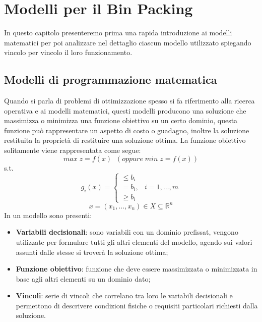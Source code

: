
\chapter{Modelli per il Bin Packing}\label{chap:four}
In questo capitolo presenteremo prima una rapida introduzione ai modelli matematici per poi analizzare nel dettaglio ciascun modello utilizzato spiegando vincolo per vincolo il loro funzionamento.

\section{Modelli di programmazione matematica}
Quando si parla di problemi di ottimizzazione spesso si fa riferimento alla ricerca operativa e ai modelli matematici, questi modelli producono una soluzione che  massimizza o minimizza una funzione obiettivo su un certo dominio, questa funzione può rappresentare un aspetto di costo o guadagno,  inoltre la soluzione restituita la proprietà di restituire una soluzione ottima. La funzione obiettivo solitamente viene rappresentata come segue:
$$ max\; z = f ( x )\;\; (oppure\; min\; z = f ( x ))$$
s.t.
$$g_i (x) = \begin{cases} \leq b_i \\ = b_i, & i = 1,\dots,m \\ \geq b_i \end{cases}$$
$$x = (x_1,\dots,x_n) \in X \subseteq \mathbb{R}^n$$
In un modello sono presenti:
\begin{itemize}
	\item \textbf{Variabili decisionali}: sono variabili con un dominio prefissat, vengono utilizzate per formulare tutti gli altri elementi del modello, agendo sui valori assunti dalle stesse si troverà la soluzione ottima;
	\item \textbf{Funzione obiettivo}: funzione che deve essere massimizzata o minimizzata in base agli altri elementi su un dominio dato;
	\item \textbf{Vincoli}: serie di vincoli che correlano tra loro le variabili decisionali e permettono di descrivere condizioni fisiche o requisiti particolari richiesti dalla soluzione.
\end{itemize}
